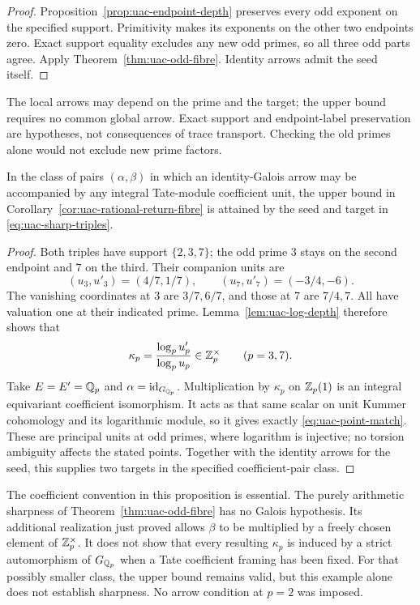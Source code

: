 \begin{proof}
Proposition~\ref{prop:uac-endpoint-depth} preserves every odd exponent
on the specified support. Primitivity makes its exponents on the other
two endpoints zero. Exact support equality excludes any new odd primes,
so all three odd parts agree. Apply Theorem~\ref{thm:uac-odd-fibre}.
Identity arrows admit the seed itself.
\end{proof}

The local arrows may depend on the prime and the target; the upper
bound requires no common global arrow. Exact support and endpoint-label
preservation are hypotheses, not consequences of trace transport.
Checking the old primes alone would not exclude new prime factors.

\begin{proposition}
\label{prop:uac-coefficient-sharpness}
In the class of pairs $(\alpha,\beta)$ in which an identity-Galois
arrow may be accompanied by any integral Tate-module coefficient unit,
the upper bound in Corollary~\ref{cor:uac-rational-return-fibre} is attained
by the seed and target in \eqref{eq:uac-sharp-triples}.
\end{proposition}

\begin{proof}
Both triples have support $\{2,3,7\}$; the odd prime $3$ stays on
the second endpoint and $7$ on the third. Their companion units are
\[
 (u_3,u'_3)=(4/7,1/7),\qquad
 (u_7,u'_7)=(-3/4,-6).
\]
The vanishing coordinates at $3$ are $3/7,6/7$, and those at $7$
are $7/4,7$. All have valuation one at their indicated prime.
Lemma~\ref{lem:uac-log-depth} therefore shows that
\[
                       \kappa_p=
                     \frac{\log_p u'_p}{\log_p u_p}
                        \in\mathbb Z_p^\times\qquad(p=3,7).
\]
Take $E=E'=\mathbb Q_p$ and $\alpha=\operatorname{id}_{G_{\mathbb Q_p}}$.
Multiplication by $\kappa_p$ on $\mathbb Z_p(1)$ is an integral
equivariant coefficient isomorphism. It acts as that same scalar
on unit Kummer cohomology and its logarithmic module, so it gives
exactly \eqref{eq:uac-point-match}. These are principal units at
odd primes, where logarithm is injective; no torsion ambiguity
affects the stated points. Together with the identity arrows for
the seed, this supplies two targets in the specified coefficient-pair
class.
\end{proof}

The coefficient convention in this proposition is essential.
The purely arithmetic sharpness of Theorem~\ref{thm:uac-odd-fibre}
has no Galois hypothesis. Its additional realization just proved
allows $\beta$ to be multiplied by a freely chosen element of
$\mathbb Z_p^\times$. It does not show that every resulting $\kappa_p$
is induced by a strict automorphism of $G_{\mathbb Q_p}$ when a Tate
coefficient framing has been fixed. For that possibly smaller
class, the upper bound remains valid, but this example alone
does not establish sharpness. No arrow condition at $p=2$ was imposed.

